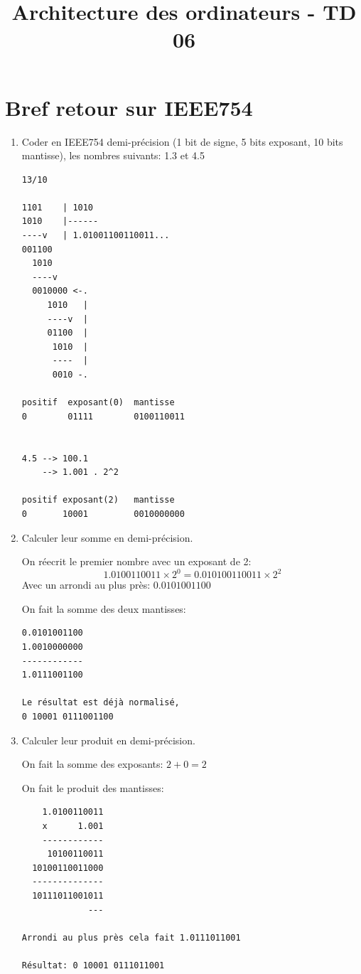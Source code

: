 \documentclass[a4paper,10pt]{exam}
\title{Architecture des ordinateurs - TD 06}
\author{}
\date{}
\begin{document}
\maketitle

\section{Bref retour sur IEEE754}
\begin{enumerate}
  \item Coder en IEEE754 demi-précision (1 bit de signe, 5 bits exposant, 10
    bits mantisse), les nombres suivants: 1.3 et 4.5
    \begin{solution}
      \begin{verbatim}
13/10

1101    | 1010
1010    |------
----v   | 1.01001100110011...
001100
  1010
  ----v
  0010000 <-.
     1010   |
     ----v  |
     01100  |
      1010  |
      ----  |
      0010 -.

positif  exposant(0)  mantisse
0        01111        0100110011


4.5 --> 100.1
    --> 1.001 . 2^2

positif exposant(2)   mantisse
0       10001         0010000000
      \end{verbatim}
    \end{solution}
  \item Calculer leur somme en demi-précision.
    \begin{solution}
      On réecrit le premier nombre avec un exposant de 2:
      $$1.0100110011 \times 2^{0} = 0.010100110011 \times 2^{2}$$
      Avec un arrondi au plus près:
      $0.0101001100$

      On fait la somme des deux mantisses:
\begin{verbatim}
0.0101001100
1.0010000000
------------
1.0111001100

Le résultat est déjà normalisé,
0 10001 0111001100
\end{verbatim}
    \end{solution}
  \item Calculer leur produit en demi-précision.
    \begin{solution}
      On fait la somme des exposants:
      $2+0 = 2$

      On fait le produit des mantisses:
\begin{verbatim}
    1.0100110011
    x      1.001
    ------------
     10100110011
  10100110011000
  --------------
  10111011001011
             ---

Arrondi au plus près cela fait 1.0111011001

Résultat: 0 10001 0111011001
\end{verbatim}
    \end{solution}
\end{enumerate}
\end{document}
